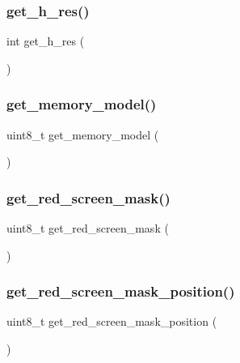 \subsubsection{\texorpdfstring{get\_h\_res()}{get\_h\_res()}}
{\footnotesize\ttfamily int get\+\_\+h\+\_\+res (\begin{DoxyParamCaption}{ }\end{DoxyParamCaption})}

\mbox{\label{group__video_gaee3838c12a8543f378920ab8f6c3cae2}} 
\subsubsection{\texorpdfstring{get\_memory\_model()}{get\_memory\_model()}}
{\footnotesize\ttfamily uint8\+\_\+t get\+\_\+memory\+\_\+model (\begin{DoxyParamCaption}{ }\end{DoxyParamCaption})}

\mbox{\label{group__video_gac758200041aed05cff7f056c48456157}} 
\subsubsection{\texorpdfstring{get\_red\_screen\_mask()}{get\_red\_screen\_mask()}}
{\footnotesize\ttfamily uint8\+\_\+t get\+\_\+red\+\_\+screen\+\_\+mask (\begin{DoxyParamCaption}{ }\end{DoxyParamCaption})}

\mbox{\label{group__video_ga5ad95fa9656e4db3ac20e178769336f9}} 
\subsubsection{\texorpdfstring{get\_red\_screen\_mask\_position()}{get\_red\_screen\_mask\_position()}}
{\footnotesize\ttfamily uint8\+\_\+t get\+\_\+red\+\_\+screen\+\_\+mask\+\_\+position (\begin{DoxyParamCaption}{ }\end{DoxyParamCaption})}

